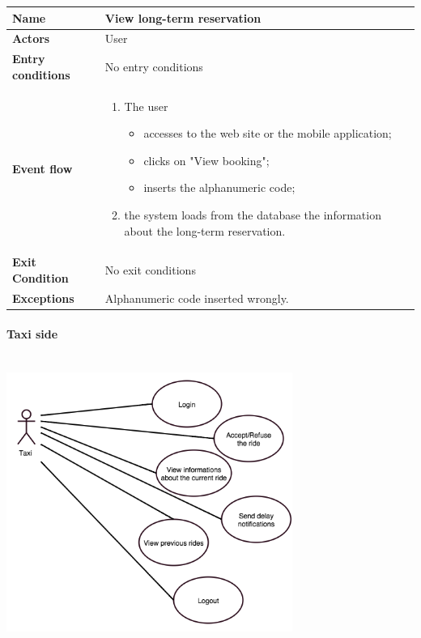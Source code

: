 		\begin{tabular}{l l}
		 \textbf {Name} & View long-term reservation  \\ \hline
		 \textbf{Actors} & User \\ \hline
		 \textbf{Entry conditions} & No entry conditions \\ \hline
		 \textbf{Event flow} & 
		 \parbox{0.7\textwidth}{
		 \begin{enumerate}
		 \item The user
		 \begin{itemize}
		 \item accesses to the web site or the mobile application;
		 \item clicks on "View booking";
		 \item inserts the alphanumeric code;
		 \end{itemize}
		 \item the system loads from the database the information about the long-term reservation.
		 \end{enumerate}
		 } \\ \hline
		 \textbf{Exit Condition} & No exit conditions \\ \hline
		 \textbf{Exceptions} & Alphanumeric code inserted wrongly.
		\end{tabular}
		\newpage
		\paragraph{Taxi side}
			\begin{center}
			~\\
		\includegraphics[width=0.70\textwidth]{./images/UseCaseTaxi.png}~
			\end{center}
		
